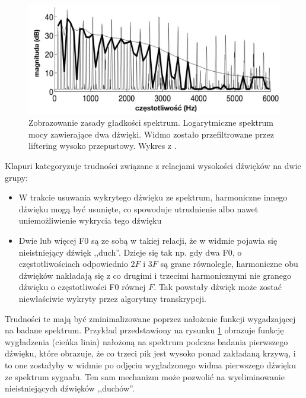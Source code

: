 \documentclass[12pt,a4paper,twoside]{mwart}
\begin{document}
\begin{figure}[ht]
  \begin{center}
    \includegraphics[scale=0.38]{images/spectral_smoothnes_kapuri.jpg}
    \caption{Zobrazowanie zasady gładkości spektrum. Logarytmiczne spektrum mocy zawierające dwa dźwięki. Widmo zostało przefiltrowane przez liftering wysoko przepustowy. Wykres z 
    \cite[3383]{Transcription:Klapuri:MultipitchEstimationAndSeparation}
    .}
    \label{fig:specSmooth:kapuri}
  \end{center}
\end{figure}

Klapuri kategoryzuje trudności związane z relacjami wysokości dźwięków na dwie grupy:
\begin{itemize}
\item W trakcie usuwania wykrytego dźwięku ze spektrum, harmoniczne innego dźwięku mogą być usunięte, co spowoduje utrudnienie albo nawet uniemożliwienie wykrycia tego dźwięku
\item Dwie lub więcej F0 są ze sobą w takiej relacji, że w widmie pojawia się nieistniejący dźwięk ,,duch''. Dzieje się tak np. gdy dwa F0, o częstotliwościach odpowiednio $2F$ i $3F$ są grane równolegle, harmoniczne obu dźwięków nakładają się z co drugimi i trzecimi harmonicznymi nie granego dźwięku o częstotliwości F0 równej $F$. Tak powstały dźwięk może zostać niewłaściwie wykryty przez algorytmy transkrypcji.
\end{itemize}
Trudności te mają być zminimalizowane poprzez nałożenie funkcji wygadzającej na badane spektrum. Przykład przedstawiony na rysunku \ref{fig:specSmooth:kapuri} obrazuje funkcję wygładzenia (cieńka linia) nałożoną na spektrum podczas badania pierwszego dźwięku, które obrazuje, że co trzeci pik jest wysoko ponad zakładaną krzywą, i to one zostałyby w widmie po odjęciu wygładzonego widma pierwszego dźwięku ze spektrum sygnału. Ten sam mechanizm może pozwolić na wyeliminowanie nieistniejących dźwięków ,,duchów''.
\end{document}
